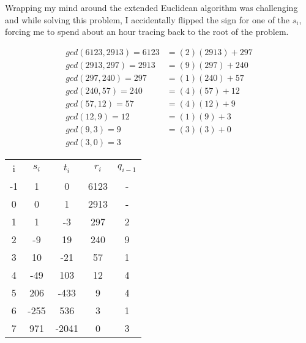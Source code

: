 \documentclass{article}
\begin{document}
Wrapping my mind around the extended Euclidean algorithm was challenging and while solving this problem, I accidentally flipped the sign for one of the $s_{i}$, forcing me to spend about an hour tracing back to the root of the problem.

\begin{align*}
   gcd(6123 ,2913) = 6123 &= (2)(2913) + 297 \\
   gcd(2913,297) = 2913 &= (9)(297) + 240 \\
   gcd(297, 240) = 297 &= (1)(240) + 57 \\
   gcd(240,57) = 240 &= (4)(57) + 12 \\
   gcd(57, 12) = 57 &= (4)(12) + 9 \\
   gcd(12, 9) = 12 &= (1)(9) + 3 \\
   gcd(9, 3) = 9 &= (3)(3) + 0 \\
   gcd(3, 0) = 3
\end{align*}

\begin{center}
\begin{tabular}{ |c|c|c|c|c| } 
 \hline
 i & $s_{i}$ & $t_{i}$ & $r_{i}$ & $q_{i-1}$ \\ 
 -1 & 1 & 0 & 6123 & - \\ 
  0 & 0 & 1 & 2913 & - \\ 
  1 & 1 & -3 & 297 & 2 \\ 
  2 & -9 & 19 & 240 & 9 \\ 
  3 & 10 & -21 & 57 & 1 \\ 
  4 & -49 & 103 & 12 & 4 \\ 
  5 & 206 & -433 & 9 & 4 \\ 
  6 & -255 & 536 & 3 & 1 \\ 
  7 & 971 & -2041 & 0 & 3 \\ 
  \hline
\end{tabular}
\end{center}
\end{document}
